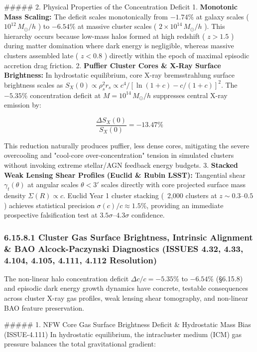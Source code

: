 \documentclass[11pt,a4paper]{article}
\theoremstyle{definition}
\theoremstyle{remark}
\begin{document}
\#\#\#\#\# 2. Physical Properties of the Concentration Deficit
1. \textbf{Monotonic Mass Scaling:} The deficit scales monotonically from $-1.74\%$ at galaxy scales ( $10^{12} \, M_\odot/h$ ) to $-6.54\%$ at massive cluster scales ( $2 \times 10^{14} \, M_\odot/h$ ). This hierarchy occurs because low-mass halos formed at high redshift ( $z > 1.5$ ) during matter domination where dark energy is negligible, whereas massive clusters assembled late ( $z < 0.8$ ) directly within the epoch of maximal episodic accretion drag friction.
2. \textbf{Puffier Cluster Cores \& X-Ray Surface Brightness:} In hydrostatic equilibrium, core X-ray bremsstrahlung surface brightness scales as $S_X(0) \propto \rho_s^2 r_s \propto c^4 / [\ln(1+c) - c/(1+c)]^2$. The $-5.35\%$ concentration deficit at $M = 10^{14} \, M_\odot/h$ suppresses central X-ray emission by:


\begin{equation}
\frac{\Delta S_X(0)}{S_X(0)} = -13.47\%
\end{equation}


This reduction naturally produces puffier, less dense cores, mitigating the severe overcooling and "cool-core over-concentration" tension in simulated clusters without invoking extreme stellar/AGN feedback energy budgets.
3. \textbf{Stacked Weak Lensing Shear Profiles (Euclid \& Rubin LSST):} Tangential shear $\gamma_t(\theta)$ at angular scales $\theta < 3'$ scales directly with core projected surface mass density $\Sigma(R) \propto c$. Euclid Year 1 cluster stacking (~2,000 clusters at $z \sim 0.3\text{--}0.5$ ) achieves statistical precision $\sigma(c)/c \approx 1.5\%$, providing an immediate prospective falsification test at $3.5\sigma\text{--}4.3\sigma$ confidence.

\subsubsection{6.15.8.1 Cluster Gas Surface Brightness, Intrinsic Alignment \& BAO Alcock-Paczynski Diagnostics (ISSUES 4.32, 4.33, 4.104, 4.105, 4.111, 4.112 Resolution)}

The non-linear halo concentration deficit $\Delta c/c = -5.35\%$ to $-6.54\%$ (\S 6.15.8) and episodic dark energy growth dynamics have concrete, testable consequences across cluster X-ray gas profiles, weak lensing shear tomography, and non-linear BAO feature preservation.

\#\#\#\#\# 1. NFW Core Gas Surface Brightness Deficit \& Hydrostatic Mass Bias (ISSUE-4.111)
In hydrostatic equilibrium, the intracluster medium (ICM) gas pressure balances the total gravitational gradient:
\end{document}
